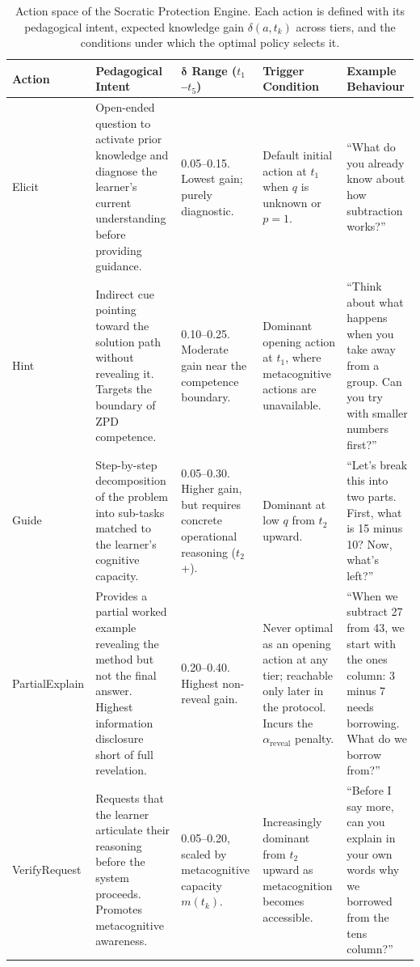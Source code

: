 \documentclass[fleqn,10pt]{wlscirep}
\begin{document}
\begin{table}[H]
\centering
\caption{Action space of the Socratic Protection Engine. Each action is defined with its pedagogical intent, expected knowledge gain $\delta(a, t_k)$ across tiers, and the conditions under which the optimal policy selects it.}
\label{tab:actions}
\small
\begin{tabular}{p{1.5cm}p{2.5cm}p{2.5cm}p{2.5cm}p{3.5cm}}
\hline
\textbf{Action} & \textbf{Pedagogical Intent} & $\bm{\delta}$ \textbf{Range} ($t_1$--$t_5$) & \textbf{Trigger Condition} & \textbf{Example Behaviour} \\
\hline
Elicit & Open-ended question to activate prior knowledge and diagnose the learner's current understanding before providing guidance. & 0.05--0.15. Lowest gain; purely diagnostic. & Default initial action at $t_1$ when $q$ is unknown or $p = 1$. & ``What do you already know about how subtraction works?'' \\
\hline
Hint & Indirect cue pointing toward the solution path without revealing it. Targets the boundary of ZPD competence. & 0.10--0.25. Moderate gain near the competence boundary. & Dominant opening action at $t_1$, where metacognitive actions are unavailable. & ``Think about what happens when you take away from a group. Can you try with smaller numbers first?'' \\
\hline
Guide & Step-by-step decomposition of the problem into sub-tasks matched to the learner's cognitive capacity. & 0.05--0.30. Higher gain, but requires concrete operational reasoning ($t_2$+). & Dominant at low $q$ from $t_2$ upward. & ``Let's break this into two parts. First, what is 15 minus 10? Now, what's left?'' \\
\hline
Partial\-Explain & Provides a partial worked example revealing the method but not the final answer. Highest information disclosure short of full revelation. & 0.20--0.40. Highest non-reveal gain. & Never optimal as an opening action at any tier; reachable only later in the protocol. Incurs the $\alpha_{\text{reveal}}$ penalty. & ``When we subtract 27 from 43, we start with the ones column: 3 minus 7 needs borrowing. What do we borrow from?'' \\
\hline
Verify\-Request & Requests that the learner articulate their reasoning before the system proceeds. Promotes metacognitive awareness. & 0.05--0.20, scaled by metacognitive capacity $m(t_k)$. & Increasingly dominant from $t_2$ upward as metacognition becomes accessible. & ``Before I say more, can you explain in your own words why we borrowed from the tens column?'' \\
\hline
\end{tabular}
\end{table}
\end{document}
